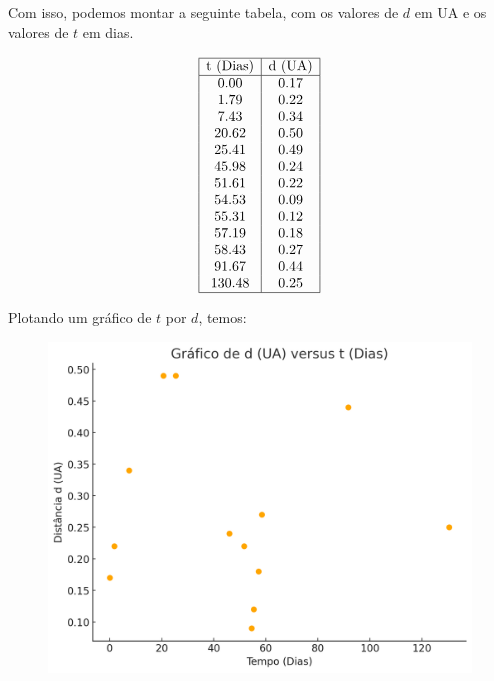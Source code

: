 \documentclass[11pt]{article}
\begin{document}
\begin{pproblem}
\begin{pssolution*}{}{}
\begin{alternativas}
            Com isso, podemos montar a seguinte tabela, com os valores de \(d\) em UA e os valores de \(t\) em dias.

            \[
                \begin{array}{|c|c|}
                \hline
                \text{t (Dias)} & \text{d (UA)} \\
                \hline
                0.00 &    0.17 \\
                1.79 &    0.22 \\
                7.43 &    0.34 \\
                20.62 &    0.50 \\
                25.41 &    0.49 \\
                45.98 &    0.24 \\
                51.61 &    0.22 \\
                54.53 &    0.09 \\
                55.31 &    0.12 \\
                57.19 &    0.18 \\
                58.43 &    0.27 \\
                91.67 &    0.44 \\
                130.48 &    0.25 \\
                \hline
                \end{array}
            \]

            Plotando um gráfico de \(t\) por \(d\), temos:
            
            \begin{figure}[H]
                \centering
                \includegraphics[width=0.85\linewidth]{imagens/graficoorbita.png}
            \end{figure}


\end{alternativas}
\end{pssolution*}
\end{pproblem}
\end{document}
